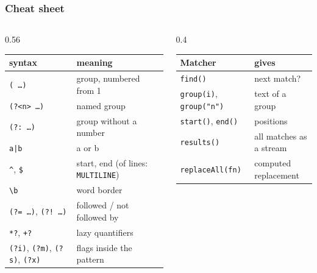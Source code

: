 \documentclass[aspectratio=169,10pt,compress]{beamer}
\begin{document}
\begin{frame}[t,fragile] \frametitle{Cheat sheet}
  \begin{columns}[T]
    \begin{column}{0.56\textwidth}
      \begin{center}\scriptsize
      \begin{tabular}{@{}ll@{}}
        \toprule
        \textbf{syntax}            & \textbf{meaning} \\
        \midrule
        \texttt{( \dots )}          & group, numbered from 1 \\
        \texttt{(?<n> \dots )}      & named group \\
        \texttt{(?: \dots )}        & group without a number \\
        \texttt{a|b}                & a or b \\
        \texttt{\textasciicircum}, \texttt{\$} & start, end (of lines: \texttt{MULTILINE}) \\
        \texttt{\textbackslash b}   & word border \\
        \texttt{(?= \dots )}, \texttt{(?! \dots )} & followed / not followed by \\
        \texttt{*?}, \texttt{+?}    & lazy quantifiers \\
        \texttt{(?i)}, \texttt{(?m)}, \texttt{(?s)}, \texttt{(?x)} & flags inside the pattern \\
        \bottomrule
      \end{tabular}
      \end{center}
    \end{column}
    \begin{column}{0.4\textwidth}
      \begin{center}\scriptsize
      \begin{tabular}{@{}ll@{}}
        \toprule
        \textbf{Matcher}           & \textbf{gives} \\
        \midrule
        \texttt{find()}            & next match? \\
        \texttt{group(i)}, \texttt{group("n")} & text of a group \\
        \texttt{start()}, \texttt{end()} & positions \\
        \texttt{results()}         & all matches as a stream \\
        \texttt{replaceAll(fn)}    & computed replacement \\
        \bottomrule
      \end{tabular}
      \end{center}
    \end{column}
  \end{columns}
\end{frame}
\end{document}
